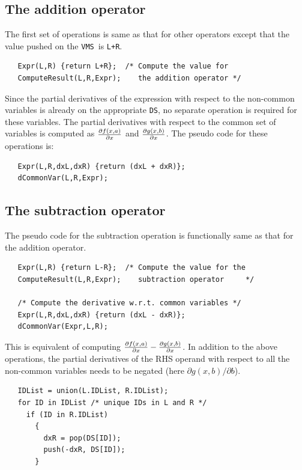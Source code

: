 \documentclass[12pt]{article}
\newcommand{\DS}{{\tt DS}}
\newcommand{\VMS}{{\tt VMS}}
\begin{document}
\subsection{The addition operator}

The first set of operations is same as that for other operators except
that the value pushed on the \VMS\ is {\tt L+R}.
\begin{verbatim}
   Expr(L,R) {return L+R};  /* Compute the value for 
   ComputeResult(L,R,Expr);    the addition operator */
\end{verbatim}
Since the partial derivatives of the expression with respect to the
non-common variables is already on the appropriate \DS, no separate
operation is required for these variables.  The partial derivatives
with respect to the common set of variables is computed as ${\partial
f(x,a) \over {\partial x}}$ and ${\partial g(x,b) \over {\partial
x}}$.  The pseudo code for these operations is:
\begin{verbatim}
   Expr(L,R,dxL,dxR) {return (dxL + dxR)};
   dCommonVar(L,R,Expr);
\end{verbatim}
%
%
\subsection{The subtraction operator}

The pseudo code for the subtraction operation is functionally same as
that for the addition operator.
\begin{verbatim}
   Expr(L,R) {return L-R};  /* Compute the value for the 
   ComputeResult(L,R,Expr);    subtraction operator     */

   /* Compute the derivative w.r.t. common variables */
   Expr(L,R,dxL,dxR) {return (dxL - dxR)};
   dCommonVar(Expr,L,R);
\end{verbatim}
This is equivalent of computing ${\partial f(x,a) \over {\partial
    x}}-{\partial g(x,b) \over {\partial x}}$.  In addition to the
above operations, the partial derivatives of the RHS operand with
respect to all the non-common variables needs to be negated (here
$\partial g(x,b) / \partial b$).
\begin{verbatim}
   IDList = union(L.IDList, R.IDList);
   for ID in IDList /* unique IDs in L and R */
     if (ID in R.IDList)
       {
         dxR = pop(DS[ID]);
         push(-dxR, DS[ID]);
       }
\end{verbatim}
  
\end{document}
